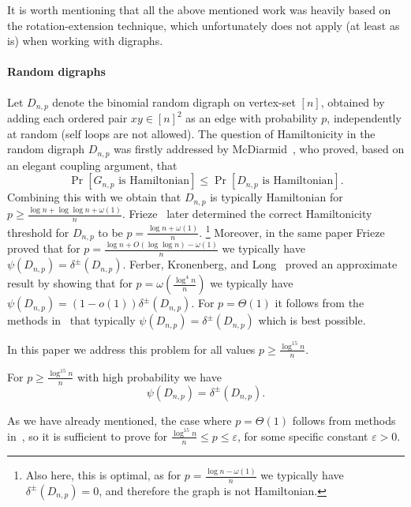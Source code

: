 \documentclass{article}
\begin{document}
	It is worth mentioning that all the above mentioned work was heavily based on the rotation-extension technique, which unfortunately does not apply (at least as is) when working with digraphs.
	
	\paragraph*{Random digraphs}
	Let $D_{n,p}$ denote the binomial random digraph on vertex-set $[n]$, obtained by adding each ordered pair $xy\in [n]^2$ as an edge with probability $p$, independently at random (self loops are not allowed). The question of Hamiltonicity in the random digraph $D_{n,p}$ was firstly addressed by McDiarmid~\cite{mcdiarmid1980clutter}, who proved, based on an elegant coupling argument, that 
	$$\Pr\left[G_{n,p} \text{ is Hamiltonian} \right] \le \Pr\left[D_{n,p} \text{ is Hamiltonian} \right].$$
	Combining this with  \cites{bollobas1984evolution,komlos1983limit} we obtain that $D_{n,p}$ is typically Hamiltonian for $p \ge \frac{\log n + \log \log n + \omega(1)}{n}$. Frieze~\cite{frieze1988algorithm} later determined the correct Hamiltonicity threshold for $D_{n,p}$ to be $p = \frac{\log n + \omega(1)}{n}$. \footnote{Also here, this is optimal, as for $p = \frac{\log n - \omega(1)}{n}$ we typically have $\delta^{\pm}\left(D_{n,p} \right) = 0$, and therefore the graph is not Hamiltonian.} Moreover, in the same paper Frieze proved that for $p=\frac{\log n +O(\log\log  n)-\omega(1)}{n}$ we typically have $\psi(D_{n,p})=\delta^{\pm}(D_{n,p})$.
	Ferber, Kronenberg, and Long~\cite{ferber2017packing} proved an approximate result by showing that for $p=\omega\left(\frac{\log^4n}{n}\right)$ we typically have $\psi\left(D_{n,p} \right) = (1-o(1))\delta^{\pm}\left(D_{n,p} \right)$. For $p=\Theta(1)$ it follows from the methods in~\cites{kuhn2013hamilton}  that typically $\psi\left(D_{n,p} \right) = \delta^{\pm}\left(D_{n,p} \right)$ which is best possible. 
	
	In this paper we address this problem for all values $p\geq \frac{\log^{15}n}{n}$. 
	\begin{theorem}
		\label{thm:main3}
		For $p\geq \frac{\log^{15} n}{n}$ with high probability we have 
		\[\psi\left(D_{n,p} \right) = \delta^{\pm}\left(D_{n,p} \right).\]
	\end{theorem}
	As we have already mentioned, the case where $p = \Theta(1)$ follows from methods in~\cite{kuhn2013hamilton}, so it is sufficient to prove  for $\frac{\log^{15} n}{n} \le p \le \varepsilon$, for some specific constant $\varepsilon > 0$.
	
\end{document}
